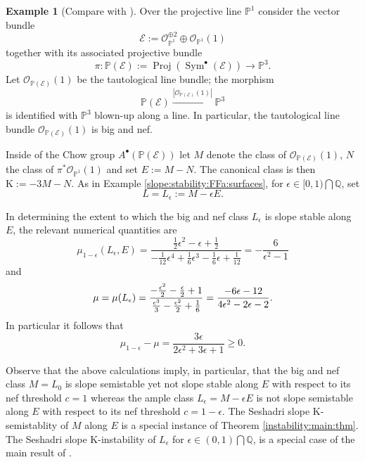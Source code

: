 \documentclass[10pt,letterpaper]{amsart}
\renewcommand{\geq}{\geqslant}
\newcommand{\Osh}{{\mathcal O}}                        %
\newcommand{\K}{\mathrm{K}}
\newcommand{\PP}{\mathbb{P}} %
\newcommand{\QQ}{\mathbb{Q}} %
\theoremstyle{definition}
\newtheorem{example}[theorem]{Example}
\numberwithin{equation}{section}
\begin{document}
\begin{example}[Compare with {\cite[Theorem 1]{Hashimoto:2018}}]\label{PP^3:blownup:line} 
Over the projective line $\PP^1$ consider the vector bundle
$$
\mathcal{E} := \Osh_{\PP^1}^{\oplus 2} \oplus \Osh_{\PP^1}(1)
$$
together with its associated projective bundle
$$
\pi \colon \PP(\mathcal{E}) := \operatorname{Proj} \left(\operatorname{Sym}^\bullet(\mathcal{E}) \right)\rightarrow \PP^3 \text{.}
$$
Let $\Osh_{\PP(\mathcal{E})}(1)$ be the tautological line bundle;  the morphism
$$
\PP(\mathcal{E}) \xrightarrow{|\Osh_{\PP(\mathcal{E})}(1)|} \PP^3
$$
is identified with $\PP^3$ blown-up along a line.  In particular, the tautological line bundle $\Osh_{\PP(\mathcal{E})}(1)$ is big and nef.  

Inside of the Chow group $A^\bullet(\PP(\mathcal{E}))$ let $M$ denote the class of $\Osh_{\PP(\mathcal{E})}(1)$, $N$ the class of $\pi^*\Osh_{\PP^1}(1)$ and set
$E := M - N  \text{.}$
The canonical class is then
$\K := - 3 M - N \text{.}$
As in Example \ref{slope:stability:FFa:surfaces}, for $\epsilon \in [0,1) \bigcap \QQ$, set
$$L = L_\epsilon:= M - \epsilon E \text{.}$$

In determining the extent to which the big and nef class $L_{\epsilon}$ is slope stable along $E$, the relevant numerical  quantities are
$$
\mu_{1 - \epsilon}(L_\epsilon,E) 
= 
\frac{\frac{1}{2}\epsilon^2 - \epsilon + \frac{1}{2} }{- \frac{1}{12}\epsilon^4 + \frac{1}{6}\epsilon^3 - \frac{1}{6}\epsilon + \frac{1}{12}} 
=  - \frac{6}{\epsilon^2-1}
$$
and
$$
\mu = \mu(L_\epsilon) 
= \frac{ - \frac{\epsilon^2}{2} - \frac{\epsilon}{2}+1}{\frac{\epsilon^3}{3} - \frac{\epsilon^2}{2} + \frac{1}{6} } \\
= \frac{-6\epsilon -12}{4\epsilon^2-2\epsilon-2 } 
\text{.}
$$
In particular it follows that
$$
\mu_{1 - \epsilon}  - \mu 
= \frac{3\epsilon}{2\epsilon^2+3\epsilon + 1} \geq 0 \text{.}
$$

Observe that the above calculations imply, in particular, that the big and nef class 
$M = L_0$ is slope semistable yet not slope stable along $E$ with respect to its nef threshold $c = 1$ 
whereas the ample class $L_\epsilon =  M - \epsilon E$
is not slope semistable along $E$ with respect to its nef threshold 
$c = 1 - \epsilon \text{.}$
The Seshadri slope $\K$-semistablity of $M$ along $E$ is a special instance of Theorem \ref{instability:main:thm}.  The Seshadri slope $\K$-instability of $L_{\epsilon}$ for $\epsilon \in (0,1) \bigcap \QQ$, is a special case of the main result of \cite{Hashimoto:2018}.
\end{example}
\end{document}
